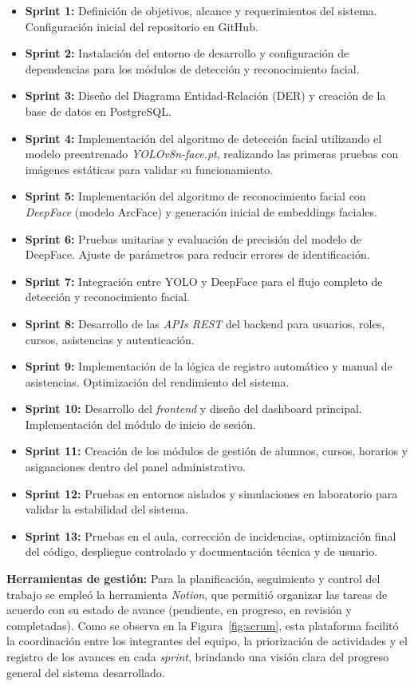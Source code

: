 \begin{itemize}
\item \textbf{Sprint 1:} Definición de objetivos, alcance y requerimientos del sistema. Configuración inicial del repositorio en GitHub.
\item \textbf{Sprint 2:} Instalación del entorno de desarrollo y configuración de dependencias para los módulos de detección y reconocimiento facial.
\item \textbf{Sprint 3:} Diseño del Diagrama Entidad-Relación (DER) y creación de la base de datos en PostgreSQL.
\item \textbf{Sprint 4:} Implementación del algoritmo de detección facial utilizando el modelo preentrenado \textit{YOLOv8n-face.pt}, realizando las primeras pruebas con imágenes estáticas para validar su funcionamiento.
\item \textbf{Sprint 5:} Implementación del algoritmo de reconocimiento facial con \textit{DeepFace} (modelo ArcFace) y generación inicial de embeddings faciales.
\item \textbf{Sprint 6:} Pruebas unitarias y evaluación de precisión del modelo de DeepFace. Ajuste de parámetros para reducir errores de identificación.
\item \textbf{Sprint 7:} Integración entre YOLO y DeepFace para el flujo completo de detección y reconocimiento facial.
\item \textbf{Sprint 8:} Desarrollo de las \textit{APIs REST} del backend para usuarios, roles, cursos, asistencias y autenticación.
\item \textbf{Sprint 9:} Implementación de la lógica de registro automático y manual de asistencias. Optimización del rendimiento del sistema.
\item \textbf{Sprint 10:} Desarrollo del \textit{frontend} y diseño del dashboard principal. Implementación del módulo de inicio de sesión.
\item \textbf{Sprint 11:} Creación de los módulos de gestión de alumnos, cursos, horarios y asignaciones dentro del panel administrativo.
\item \textbf{Sprint 12:} Pruebas en entornos aislados y simulaciones en laboratorio para validar la estabilidad del sistema.
\item \textbf{Sprint 13:} Pruebas en el aula, corrección de incidencias, optimización final del código, despliegue controlado y documentación técnica y de usuario.
\end{itemize}


\textbf{Herramientas de gestión:} Para la planificación, seguimiento y control del trabajo se empleó la herramienta \textit{Notion}, que permitió organizar las tareas de acuerdo con su estado de avance (pendiente, en progreso, en revisión y completadas).
Como se observa en la Figura~\ref{fig:scrum}, esta plataforma facilitó la coordinación entre los integrantes del equipo, la priorización de actividades y el registro de los avances en cada \textit{sprint}, brindando una visión clara del progreso general del sistema desarrollado.

